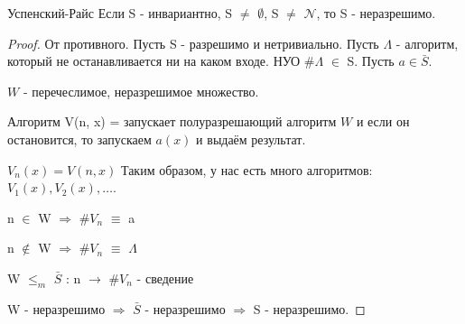 \begin{theorem}{Успенский-Райс}
	Если S - инвариантно, S $\ne$  $\emptyset$, S $\ne$ $\mathcal{N}$, то S - неразрешимо.	
\end{theorem}
\begin{proof}
	От противного. Пусть S - разрешимо  и нетривиально. Пусть $\Lambda$ - алгоритм, который не останавливается ни на каком входе.
	НУО \#$\Lambda$ $\in$ S. Пусть $a \in \bar{S}$.

	$W$ - перечеслимое, неразрешимое множество.

	Алгоритм V(n, x) = запускает полуразрешающий алгоритм $W$ и если он остановится, то запускаем $a(x)$ и выдаём результат.

	$V_n(x) = V(n, x)$ Таким образом, у нас есть много алгоритмов: $V_1(x), V_2(x), \dots$.

	n $\in$ W $\Rightarrow$ \#$V_n$ $\equiv$ a

	n $\notin$ W $\Rightarrow$ \#$V_n$ $\equiv$ $\Lambda$

	W $\le_m$ $\bar{S}$ : n $\longrightarrow$ \#$V_n$ - сведение

	W - неразрешимо $\Rightarrow$ $\bar{S}$ - неразрешимо $\Rightarrow$  S - неразрешимо.
\end{proof}
